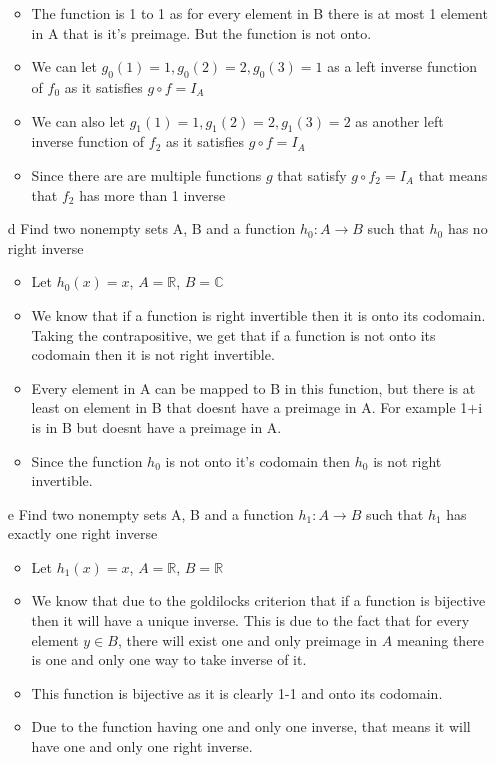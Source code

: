\documentclass{article}
\begin{document}
\begin{enumerate}
\begin{itemize}
        \item The function is 1 to 1 as for every element in B there is at most 1 element in A that is it's preimage. But the function is not onto. 
        \item We can let $g_0(1) = 1, g_0(2) =2, g_0(3) = 1$ as a left inverse function of $f_0$ as it satisfies $g \circ f = I_A $
        \item We can also let $g_1(1) = 1, g_1(2) =2, g_1(3) = 2$ as another left inverse function of $f_2$ as it satisfies $g \circ f = I_A $
        \item Since there are are multiple functions $g$ that satisfy $g \circ f_2= I_A$ that means that $f_2$ has more than 1 inverse
    \end{itemize}
    \item [d] Find two nonempty sets A, B and a function $h_0 : A \rightarrow B$ such that $h_0$ has no right
    inverse \begin{itemize}
        \item Let $h_0(x) = x$, $A = \mathbb{R}$, $B = \mathbb{C}$
        \item We know that if a function is right invertible then it is onto its codomain. Taking the contrapositive, we get that if a function is not onto its codomain then it is not right invertible. 
        \item Every element in A can be mapped to B in this function, but there is at least on element in B that doesnt have a preimage in A. For example 1+i  is in B but doesnt have a preimage in A.
        \item Since the function $h_0$ is not onto it's codomain then $h_0$ is not right invertible. 
    \end{itemize}
    \item [e] Find two nonempty sets A, B and a function $h_1 : A \rightarrow B$ such that $h_1$ has exactly
    one right inverse \begin{itemize}
        \item Let $h_1(x) = x$, $A = \mathbb{R}$, $ B =\mathbb{R} $
        \item We know that due to the goldilocks criterion that if a function is bijective then it will have a unique inverse. This is due to the fact that for every element $y \in B $, there will exist one and only preimage in $A$ meaning there is one and only one way to take inverse of it. 
        \item This function is bijective as it is clearly 1-1 and onto its codomain. 
        \item Due to the function having one and only one inverse, that means it will have one and only one right inverse. 

\end{itemize}
\end{enumerate}
\end{document}
